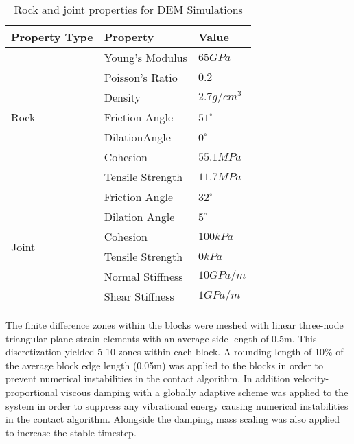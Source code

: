 \begin{table}[]
\centering
\caption{Rock and joint properties for DEM Simulations}
\label{tab:demProp}
\begin{tabular}{@{}lll@{}}
\toprule
Property Type          & Property         & Value        \\ \midrule
\multirow{7}{*}{Rock}  & Young's Modulus  & $65 GPa$     \\
                       & Poisson's Ratio  & $0.2$        \\
                       & Density          & $2.7 g/cm^3$ \\
                       & Friction Angle   & $51^{\circ}$ \\
                       & DilationAngle    & $0^{\circ}$  \\
                       & Cohesion         & $55.1 MPa$   \\
                       & Tensile Strength & $11.7 MPa$   \\ \cmidrule(r){1-1}
\multirow{6}{*}{Joint} & Friction Angle   & $32^{\circ}$ \\
                       & Dilation Angle   & $5^{\circ}$  \\
                       & Cohesion         & $100 kPa$    \\
                       & Tensile Strength & $0 kPa$      \\
                       & Normal Stiffness & $10 GPa/m$   \\
                       & Shear Stiffness  & $1 GPa/m$    \\ \bottomrule
\end{tabular}
\end{table}


The finite difference zones within the blocks were meshed with linear three-node triangular plane strain elements with an average side length of 0.5m. This discretization yielded 5-10 zones within each block. A rounding length of 10\% of the average block edge length (0.05m) was applied to the blocks in order to prevent numerical instabilities in the contact algorithm. In addition velocity-proportional viscous damping with a globally adaptive scheme was applied to the system in order to suppress any vibrational energy causing numerical instabilities in the contact algorithm. Alongside the damping, mass scaling was also applied to increase the stable timestep.

